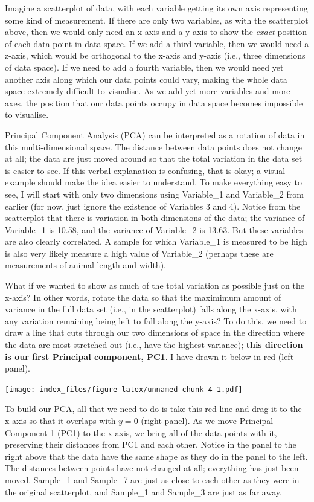\documentclass[]{article}
\begin{document}
Imagine a scatterplot of data, with each variable getting its own axis
representing some kind of measurement. If there are only two variables,
as with the scatterplot above, then we would only need an x-axis and a
y-axis to show the \emph{exact} position of each data point in data
space. If we add a third variable, then we would need a z-axis, which
would be orthogonal to the x-axis and y-axis (i.e., three dimensions of
data space). If we need to add a fourth variable, then we would need yet
another axis along which our data points could vary, making the whole
data space extremely difficult to visualise. As we add yet more
variables and more axes, the position that our data points occupy in
data space becomes impossible to visualise.

Principal Component Analysis (PCA) can be interpreted as a rotation of
data in this multi-dimensional space. The distance between data points
does not change at all; the data are just moved around so that the total
variation in the data set is easier to see. If this verbal explanation
is confusing, that is okay; a visual example should make the idea easier
to understand. To make everything easy to see, I will start with only
two dimensions using Variable\_1 and Variable\_2 from earlier (for now,
just ignore the existence of Variables 3 and 4). Notice from the
scatterplot that there is variation in both dimensions of the data; the
variance of Variable\_1 is 10.58, and the variance of Variable\_2 is
13.63. But these variables are also clearly correlated. A sample for
which Variable\_1 is measured to be high is also very likely measure a
high value of Variable\_2 (perhaps these are measurements of animal
length and width).

What if we wanted to show as much of the total variation as possible
just on the x-axis? In other words, rotate the data so that the
maximimum amount of variance in the full data set (i.e., in the
scatterplot) falls along the x-axis, with any variation remaining being
left to fall along the y-axis? To do this, we need to draw a line that
cuts through our two dimensions of space in the direction where the data
are most stretched out (i.e., have the highest variance); \textbf{this
direction is our first Principal component, PC1}. I have drawn it below
in red (left panel).

\texttt{[image: index\_files/figure-latex/unnamed-chunk-4-1.pdf]}

To build our PCA, all that we need to do is take this red line and drag
it to the x-axis so that it overlaps with \(y = 0\) (right panel). As we
move Principal Component 1 (PC1) to the x-axis, we bring all of the data
points with it, preserving their distances from PC1 and each other.
Notice in the panel to the right above that the data have the same shape
as they do in the panel to the left. The distances between points have
not changed at all; everything has just been moved. Sample\_1 and
Sample\_7 are just as close to each other as they were in the original
scatterplot, and Sample\_1 and Sample\_3 are just as far away.
\end{document}

